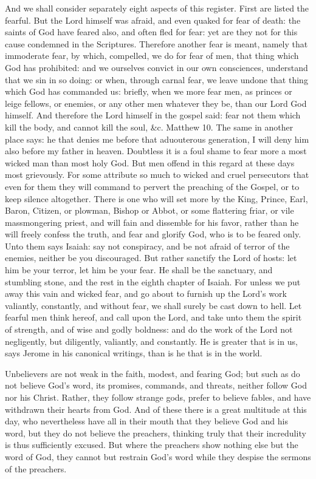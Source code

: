 And we shall consider separately eight aspects of this register. First are listed the fearful. But the Lord himself was afraid, and even quaked for fear of death: the saints of God have feared also, and often fled for fear: yet are they not for this cause condemned in the Scriptures. Therefore another fear is meant, namely that immoderate fear, by which, compelled, we do for fear of men, that thing which God has prohibited: and we ourselves convict in our own consciences, understand that we sin in so doing: or when, through carnal fear, we leave undone that thing which God has commanded us: briefly, when we more fear men, as princes or leige fellows, or enemies, or any other men whatever they be, than our Lord God himself. And therefore the Lord himself in the gospel said: fear not them which kill the body, and cannot kill the soul, \&c. Matthew 10. The same in another place says: he that denies me before that aduouterous generation, I will deny him also before my father in heaven. Doubtless it is a foul shame to fear more a most wicked man than most holy God. But men offend in this regard at these days most grievously. For some attribute so much to wicked and cruel persecutors that even for them they will command to pervert the preaching of the Gospel, or to keep silence altogether. There is one who will set more by the King, Prince, Earl, Baron, Citizen, or plowman, Bishop or Abbot, or some flattering friar, or vile massmongering priest, and will fain and dissemble for his favor, rather than he will freely confess the truth, and fear and glorify God, who is to be feared only. Unto them says Isaiah: say not conspiracy, and be not afraid of terror of the enemies, neither be you discouraged. But rather sanctify the Lord of hosts: let him be your terror, let him be your fear. He shall be the sanctuary, and stumbling stone, and the rest in the eighth chapter of Isaiah. For unless we put away this vain and wicked fear, and go about to furnish up the Lord’s work valiantly, constantly, and without fear, we shall surely be cast down to hell. Let fearful men think hereof, and call upon the Lord, and take unto them the spirit of strength, and of wise and godly boldness: and do the work of the Lord not negligently, but diligently, valiantly, and constantly. He is greater that is in us, says Jerome in his canonical writings, than is he that is in the world.

Unbelievers are not weak in the faith, modest, and fearing God; but such as do not believe God’s word, its promises, commands, and threats, neither follow God nor his Christ. Rather, they follow strange gods, prefer to believe fables, and have withdrawn their hearts from God. And of these there is a great multitude at this day, who nevertheless have all in their mouth that they believe God and his word, but they do not believe the preachers, thinking truly that their incredulity is thus sufficiently excused. But where the preachers show nothing else but the word of God, they cannot but restrain God’s word while they despise the sermons of the preachers.

